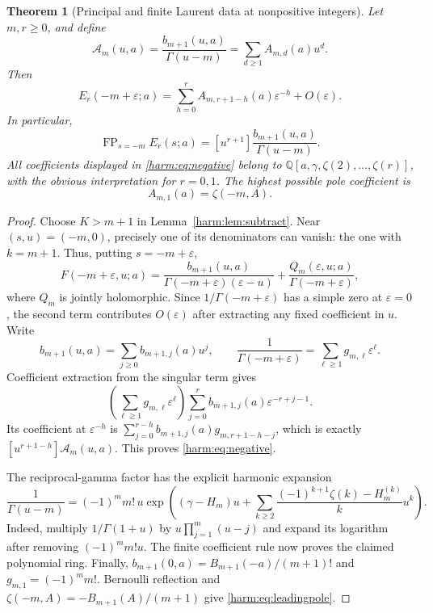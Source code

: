 \documentclass[11pt,letterpaper]{article}
\numberwithin{equation}{section}
\theoremstyle{plain}
\newtheorem{theorem}{Theorem}[section]
\theoremstyle{definition}
\theoremstyle{remark}
\begin{document}
\begin{theorem}[Principal and finite Laurent data at nonpositive integers]
\label{harm:thm:negative}
Let $m,r\geq0$, and define
\begin{equation}\label{harm:eq:A}
 \mathcal A_m(u,a)=\frac{b_{m+1}(u,a)}{\Gamma(u-m)}
                =\sum_{d\geq1}A_{m,d}(a)u^d.
\end{equation}
Then
\begin{equation}\label{harm:eq:negative}
 \boxed{\quad
 E_r(-m+\varepsilon;a)
  =\sum_{h=0}^{r}A_{m,r+1-h}(a)\varepsilon^{-h}
        +O(\varepsilon).
 \quad}
\end{equation}
In particular,
\begin{equation}\label{harm:eq:FPnegative}
 \operatorname{FP}_{s=-m}E_r(s;a)
       =[u^{r+1}]\frac{b_{m+1}(u,a)}{\Gamma(u-m)}.
\end{equation}
All coefficients displayed in \eqref{harm:eq:negative} belong to
$\mathbb Q[a,\gamma,\zeta(2),\ldots,\zeta(r)]$, with the obvious
interpretation for $r=0,1$.  The highest possible pole coefficient is
\begin{equation}\label{harm:eq:leadingpole}
 A_{m,1}(a)=\zeta(-m,A).
\end{equation}
\end{theorem}
\begin{proof}
Choose $K>m+1$ in Lemma~\ref{harm:lem:subtract}.  Near
$(s,u)=(-m,0)$, precisely one of its denominators can vanish:
the one with $k=m+1$.  Thus, putting $s=-m+\varepsilon$,
\[
 F(-m+\varepsilon,u;a)
  =\frac{b_{m+1}(u,a)}{\Gamma(-m+\varepsilon)(\varepsilon-u)}
       +\frac{Q_m(\varepsilon,u;a)}{\Gamma(-m+\varepsilon)},
\]
where $Q_m$ is jointly holomorphic.  Since $1/\Gamma(-m+\varepsilon)$
has a simple zero at $\varepsilon=0$, the second term contributes
$O(\varepsilon)$ after extracting any fixed coefficient in $u$.
Write
\[
 b_{m+1}(u,a)=\sum_{j\geq0}b_{m+1,j}(a)u^j,
 \qquad \frac1{\Gamma(-m+\varepsilon)}
              =\sum_{\ell\geq1}g_{m,\ell}\varepsilon^\ell.
\]
Coefficient extraction from the singular term gives
\[
 \left(\sum_{\ell\geq1}g_{m,\ell}\varepsilon^\ell\right)
       \sum_{j=0}^r b_{m+1,j}(a)\varepsilon^{-r+j-1}.
\]
Its coefficient at $\varepsilon^{-h}$ is
$\sum_{j=0}^{r-h}b_{m+1,j}(a)g_{m,r+1-h-j}$, which is exactly
$[u^{r+1-h}]\mathcal A_m(u,a)$.  This proves
\eqref{harm:eq:negative}.

The reciprocal-gamma factor has the explicit harmonic expansion
\begin{equation}\label{harm:eq:recipgamma}
 \frac1{\Gamma(u-m)}=(-1)^m m!\,u
 \exp\left((\gamma-H_m)u+
   \sum_{k\geq2}\frac{(-1)^{k+1}\zeta(k)-H_m^{(k)}}k u^k\right).
\end{equation}
Indeed, multiply $1/\Gamma(1+u)$ by
$u\prod_{j=1}^m(u-j)$ and expand its logarithm after removing
$(-1)^m m!u$.  The finite coefficient rule now proves the claimed
polynomial ring.  Finally,
$b_{m+1}(0,a)=B_{m+1}(-a)/(m+1)!$ and
$g_{m,1}=(-1)^m m!$.  Bernoulli reflection and
$\zeta(-m,A)=-B_{m+1}(A)/(m+1)$ give
\eqref{harm:eq:leadingpole}.
\end{proof}
\end{document}
